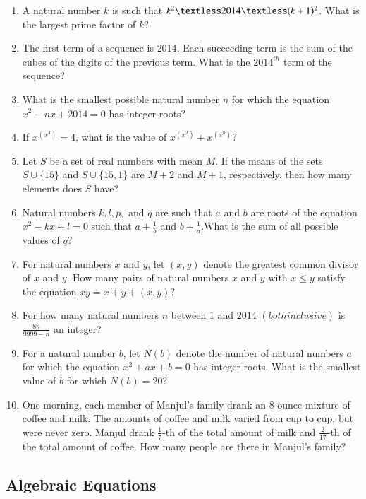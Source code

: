 \documentclass[12pt,letter paper]{article}
\providecommand{\brak}[1]{\ensuremath{\left(#1\right)}}
\begin{document}
\begin{enumerate}
   \item A natural number $k$ is such that $k^2 \textless 2014 \textless (k+1)^2$. What is the largest prime factor of $k$?
   \item The first term of a sequence is $2014$. Each succeeding term is the sum of the cubes of the digits of the previous term. What is the $2014^{th}$ term of the sequence?
   \item What is the smallest possible natural number $n$ for which the equation $x^2 - nx + 2014 = 0$ has integer roots?
   \item If $x^{\brak{x^4}} = 4$, what is the value of $x^{\brak{x^2}} + x^{\brak{x^8}}$?
   \item Let $S$ be a set of real numbers with mean $M$. If the means of the sets $S \cup \{15\}$ and $S \cup \{15, 1\}$ are $M + 2$ and $M + 1$, respectively, then how many elements does $S$ have?
   \item Natural numbers $k, l, p,$ and $q$ are such that $a$ and $b$ are roots of the equation $x^2 - kx + l = 0$ such that $a + \frac{1}{b}$ and $b + \frac{1}{a}.$What is the sum of all possible values of $q$?
   \item For natural numbers $x$ and $y$, let $\brak{x, y}$ denote the greatest common divisor of $x$ and $y$. How many pairs of natural numbers $x$ and $y$ with $x \leq y$ satisfy the equation $xy = x + y + \brak{x, y}$?
   \item For how many natural numbers $n$ between $1$ and $2014$ \brak{both inclusive} is $\frac{8n}{9999 - n}$ an integer?
   \item For a natural number $b$, let $N\brak{b}$ denote the number of natural numbers $a$ for which the equation $x^2 + ax + b = 0$ has integer roots. What is the smallest value of $b$ for which $N\brak{b} = 20$?
    \item One morning, each member of Manjul's family drank an 8-ounce mixture of coffee and milk. The amounts of coffee and milk varied from cup to cup, but were never zero. Manjul drank $\frac{1}{7}$-th of the total amount of milk and $\frac{2}{17}$-th of the total amount of coffee. How many people are there in Manjul's family?
\end{enumerate}
\begin{center}
	\section*{Algebraic Equations}
\end{center}
\end{document}
